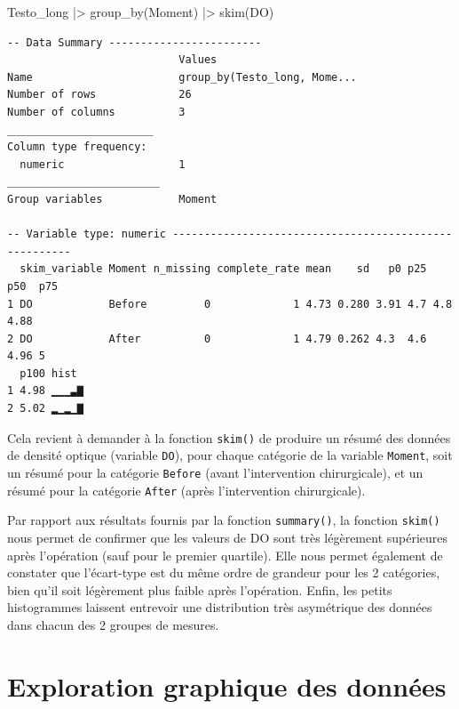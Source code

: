 \documentclass[
  french,
  a4paper,
  DIV=11,
  numbers=noendperiod,
  oneside]{scrreprt}
\newenvironment{Shaded}{}{}
\newcommand{\FunctionTok}[1]{\textcolor[rgb]{0.44,0.26,0.76}{#1}}
\newcommand{\NormalTok}[1]{\textcolor[rgb]{0.14,0.16,0.18}{#1}}
\newcommand{\SpecialCharTok}[1]{\textcolor[rgb]{0.00,0.36,0.77}{#1}}
\begin{document}
\begin{Shaded}
\begin{Highlighting}[]
\NormalTok{Testo\_long }\SpecialCharTok{|\textgreater{}}
  \FunctionTok{group\_by}\NormalTok{(Moment) }\SpecialCharTok{|\textgreater{}}
  \FunctionTok{skim}\NormalTok{(DO)}
\end{Highlighting}
\end{Shaded}

\begin{verbatim}
-- Data Summary ------------------------
                           Values                      
Name                       group_by(Testo_long, Mome...
Number of rows             26                          
Number of columns          3                           
_______________________                                
Column type frequency:                                 
  numeric                  1                           
________________________                               
Group variables            Moment                      

-- Variable type: numeric ------------------------------------------------------
  skim_variable Moment n_missing complete_rate mean    sd   p0 p25  p50  p75
1 DO            Before         0             1 4.73 0.280 3.91 4.7 4.8  4.88
2 DO            After          0             1 4.79 0.262 4.3  4.6 4.96 5   
  p100 hist 
1 4.98 ▁▁▁▃▇
2 5.02 ▂▁▂▁▇
\end{verbatim}

Cela revient à demander à la fonction \texttt{skim()} de produire un
résumé des données de densité optique (variable \texttt{DO}), pour
chaque catégorie de la variable \texttt{Moment}, soit un résumé pour la
catégorie \texttt{Before} (avant l'intervention chirurgicale), et un
résumé pour la catégorie \texttt{After} (après l'intervention
chirurgicale).

Par rapport aux résultats fournis par la fonction \texttt{summary()}, la
fonction \texttt{skim()} nous permet de confirmer que les valeurs de DO
sont très légèrement supérieures après l'opération (sauf pour le premier
quartile). Elle nous permet également de constater que l'écart-type est
du même ordre de grandeur pour les 2 catégories, bien qu'il soit
légèrement plus faible après l'opération. Enfin, les petits histogrammes
laissent entrevoir une distribution très asymétrique des données dans
chacun des 2 groupes de mesures.

\section{Exploration graphique des
données}\label{exploration-graphique-des-donnuxe9es}
\end{document}
